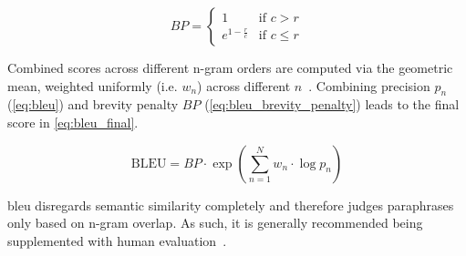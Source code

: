 \begin{equation}
    BP = \begin{cases}
        1 & \text{if } c > r \\
        e^{1 - \frac{r}{c}} & \text{if } c \leq r
    \end{cases}
\label{eq:bleu_brevity_penalty}
\end{equation}

Combined scores across different n-gram orders are computed via the geometric mean, weighted uniformly (i.e. $w_n$) across different $n$~\citep{papineni_bleu_2001,banerjee_METEOR_2005}.
Combining precision $p_n$ (\autoref{eq:bleu}) and brevity penalty $BP$ (\autoref{eq:bleu_brevity_penalty}) leads to the final score in \autoref{eq:bleu_final}.

\begin{equation}
    \text{BLEU} = BP \cdot \exp\left(\sum_{n=1}^{N} w_n \cdot \log p_n\right)
\label{eq:bleu_final}
\end{equation}

\ac{bleu} disregards semantic similarity completely and therefore judges paraphrases only based on n-gram overlap. 
As such, it is generally recommended being supplemented with human evaluation~\citep{zhou_paraphrase_2021}.






